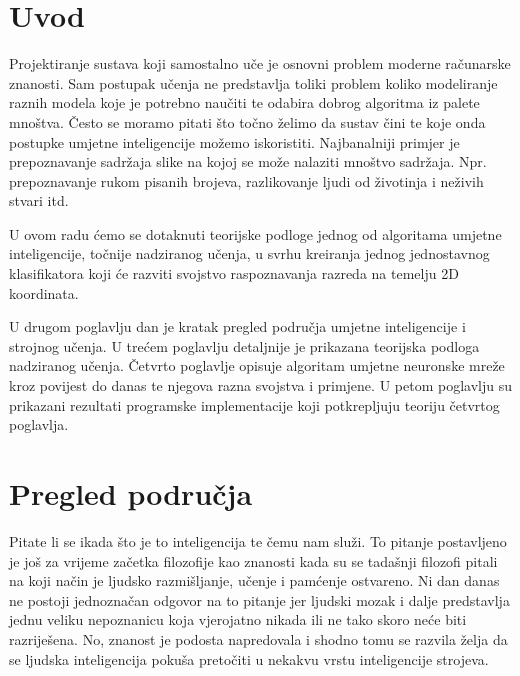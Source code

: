 \documentclass[times, utf8, zavrsni]{fer}
\begin{document}


% 


\tableofcontents

\chapter{Uvod}
Projektiranje sustava koji samostalno uče je osnovni problem moderne računarske znanosti. Sam postupak učenja ne predstavlja toliki problem koliko modeliranje raznih modela koje je potrebno naučiti te odabira dobrog algoritma iz palete mnoštva. Često se moramo pitati što točno želimo da sustav čini te koje onda postupke umjetne inteligencije možemo iskoristiti. Najbanalniji primjer je prepoznavanje sadržaja slike na kojoj se može nalaziti mnoštvo sadržaja. Npr. prepoznavanje rukom pisanih brojeva, razlikovanje ljudi od životinja i neživih stvari itd.

U ovom radu ćemo se dotaknuti teorijske podloge jednog od algoritama umjetne inteligencije, točnije nadziranog učenja, u svrhu kreiranja jednog jednostavnog klasifikatora koji će razviti svojstvo raspoznavanja razreda na temelju 2D koordinata.

\bigskip
U drugom poglavlju dan je kratak pregled područja umjetne inteligencije i strojnog učenja. U trećem poglavlju detaljnije je prikazana teorijska podloga nadziranog učenja. Četvrto poglavlje opisuje algoritam umjetne neuronske mreže kroz povijest do danas te njegova razna svojstva i primjene. U petom poglavlju su prikazani rezultati programske implementacije koji potkrepljuju teoriju četvrtog poglavlja.

\chapter{{Pregled područja}}
Pitate li se ikada što je to inteligencija te čemu nam služi. To pitanje postavljeno je još za vrijeme začetka filozofije kao znanosti kada su se tadašnji filozofi pitali na koji način je ljudsko razmišljanje, učenje i pamćenje ostvareno. Ni dan danas ne postoji jednoznačan odgovor na to pitanje jer ljudski mozak i dalje predstavlja jednu veliku nepoznanicu koja vjerojatno nikada ili ne tako skoro neće biti razriješena. No, znanost je podosta napredovala i shodno tomu se razvila želja da se ljudska inteligencija pokuša pretočiti u nekakvu vrstu inteligencije strojeva.
\end{document}
